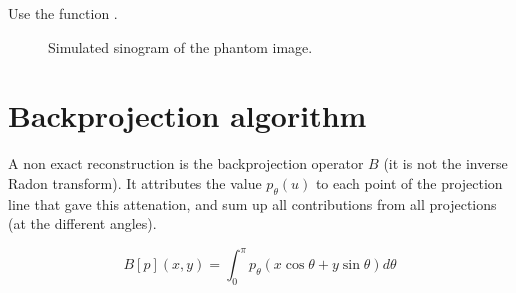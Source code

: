 \begin{mcomment}
\begin{mremark}
Use the \matlabregistered{} function .
\end{mremark}
\end{mcomment}


\begin{figure}[htbp]
 \centering\caption{Simulated sinogram of the phantom image.}%
\hspace*{1cm}
%
\label{fig:tomography:enonce:sino}%
\end{figure}



\section{Backprojection algorithm}
A non exact reconstruction is the backprojection operator $B$ (it is not the inverse Radon transform). It attributes the value $p_\theta(u)$ to each point of the projection line that gave this attenation, and sum up all contributions from all projections (at the different angles).

$$B[p](x,y)=\int_0^\pi p_\theta(x\cos\theta+y\sin\theta)d\theta $$

